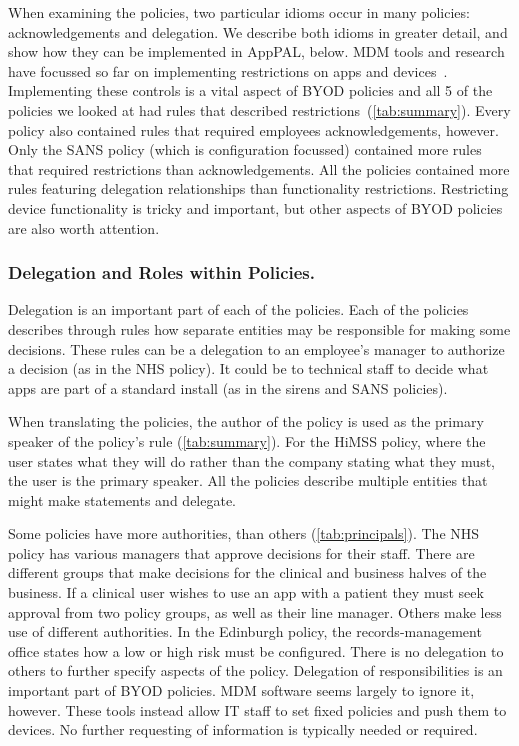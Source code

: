 \documentclass[thesis.tex]{subfiles}
\begin{document}
When examining the policies, two particular idioms occur in many policies: acknowledgements and delegation.
We describe both idioms in greater detail, and show how they can be implemented in AppPAL, below.
MDM tools and research have focussed so far on implementing restrictions on apps and devices~\cite{_ibm_????,armando_formal_2014,martinelli_enhancing_2016}.
Implementing these controls is a vital aspect of BYOD policies and all 5 of the policies we looked at had rules that described restrictions~(\autoref{tab:summary}).
Every policy also contained rules that required employees acknowledgements, however.
Only the SANS policy (which is configuration focussed) contained more rules that required restrictions than acknowledgements.
All the policies contained more rules featuring delegation relationships than functionality restrictions.
Restricting device functionality is tricky and important, but other aspects of BYOD policies are also worth attention.

\subsubsection{Delegation and Roles within Policies.}

Delegation is an important part of each of the policies.
Each of the policies describes through rules how separate entities may be responsible for making some decisions.
These rules can be a delegation to an employee's manager to authorize a decision (as in the NHS policy).
It could be to technical staff to decide what apps are part of a standard install (as in the sirens and SANS policies).

When translating the policies, the author of the policy is used as the primary speaker of the policy's rule (\autoref{tab:summary}).
For the \ac{HiMSS} policy, where the user states what they will do rather than the company stating what they must, the user is the primary speaker.
All the policies describe multiple entities that might make statements and delegate.

Some policies have more authorities, than others (\autoref{tab:principals}).
The NHS policy has various managers that approve decisions for their staff.
There are different groups that make decisions for the clinical and business halves of the business.
If a clinical user wishes to use an app with a patient they must seek approval from two policy groups, as well as their line manager.
Others make less use of different authorities.
In the Edinburgh policy, the records-management office states how a low or high risk must be configured.
There is no delegation to others to further specify aspects of the policy.
Delegation of responsibilities is an important part of BYOD policies.
MDM software seems largely to ignore it, however.
These tools instead allow IT staff to set fixed policies and push them to devices.
No further requesting of information is typically needed or required.
\end{document}
